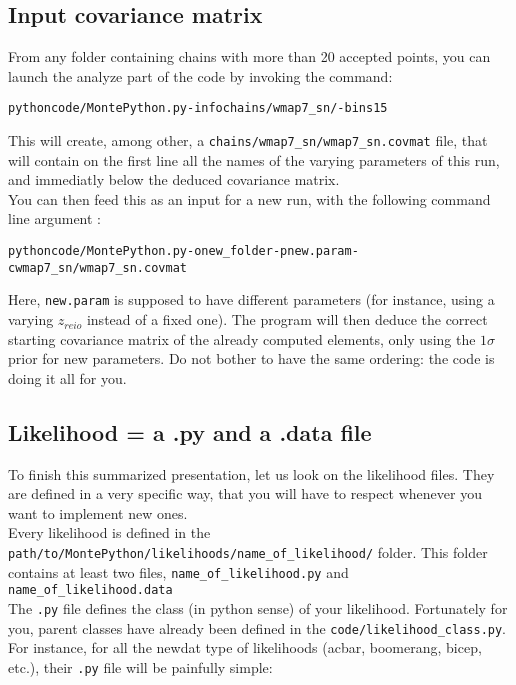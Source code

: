 \documentclass[10pt]{article}
\begin{document}
  \subsection{Input covariance matrix}

  From any folder containing chains with more than 20 accepted points, you can launch the analyze part of the code by invoking the command:
  \begin{alltt}
    python code/MontePython.py -info chains/wmap7_sn/ -bins 15
  \end{alltt}
  This will create, among other, a \verb?chains/wmap7_sn/wmap7_sn.covmat? file,
  that will contain on the first line all the names of the varying parameters
  of this run, and immediatly below the deduced covariance matrix.\\

  You can then feed this as an input for a new run, with the following command
  line argument :
  \begin{alltt}
    python code/MontePython.py -o new_folder -p new.param -c wmap7_sn/wmap7_sn.covmat
  \end{alltt}
  Here, \verb?new.param? is supposed to have different parameters (for
  instance, using a varying $z_{reio}$ instead of a fixed one). The program
  will then deduce the correct starting covariance matrix of the already
  computed elements, only using the $1\sigma$ prior for new parameters. Do not
  bother to have the same ordering: the code is doing it all for you.

  \subsection{Likelihood = a .py and a .data file\label{ssec:lkl}}

  To finish this summarized presentation, let us look on the likelihood files.
  They are defined in a very specific way, that you will have to respect
  whenever you want to implement new ones.\\

  Every likelihood is defined in the
  \verb?path/to/MontePython/likelihoods/name_of_likelihood/?
  folder. This folder contains at least two files, \verb?name_of_likelihood.py?
  and \verb?name_of_likelihood.data?\\

  The \verb?.py? file defines the class (in python sense) of your likelihood.
  Fortunately for you, parent classes have already been defined in the
  \verb?code/likelihood_class.py?. For instance, for all the newdat type of
  likelihoods (acbar, boomerang, bicep, etc.), their \verb?.py? file will be
  painfully simple:
\end{document}

